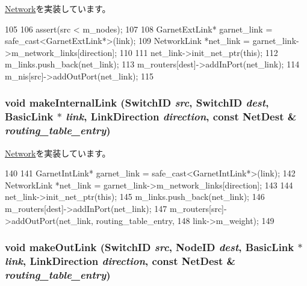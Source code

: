 \hyperlink{classNetwork_a989337badc16737935316d1faa84a017}{Network}を実装しています。


\begin{DoxyCode}
105 {
106     assert(src < m_nodes);
107 
108     GarnetExtLink* garnet_link = safe_cast<GarnetExtLink*>(link);
109     NetworkLink *net_link = garnet_link->m_network_links[direction];
110 
111     net_link->init_net_ptr(this);
112     m_links.push_back(net_link);
113     m_routers[dest]->addInPort(net_link);
114     m_nis[src]->addOutPort(net_link);
115 }
\end{DoxyCode}
\hypertarget{classGarnetNetwork_a035f37231d3a7edcadd92b7d9e17d4e4}{
\subsubsection[{makeInternalLink}]{\setlength{\rightskip}{0pt plus 5cm}void makeInternalLink ({\bf SwitchID} {\em src}, \/  {\bf SwitchID} {\em dest}, \/  {\bf BasicLink} $\ast$ {\em link}, \/  LinkDirection {\em direction}, \/  const {\bf NetDest} \& {\em routing\_\-table\_\-entry})}}
\label{classGarnetNetwork_a035f37231d3a7edcadd92b7d9e17d4e4}


\hyperlink{classNetwork_adc0a708d423af0acbe045a50a46d7b03}{Network}を実装しています。


\begin{DoxyCode}
140 {
141     GarnetIntLink* garnet_link = safe_cast<GarnetIntLink*>(link);
142     NetworkLink *net_link = garnet_link->m_network_links[direction];
143 
144     net_link->init_net_ptr(this);
145     m_links.push_back(net_link);
146     m_routers[dest]->addInPort(net_link);
147     m_routers[src]->addOutPort(net_link, routing_table_entry,
148                                          link->m_weight);
149 }
\end{DoxyCode}
\hypertarget{classGarnetNetwork_a87915d87a2b4c11ae5f0f4da31bd2375}{
\subsubsection[{makeOutLink}]{\setlength{\rightskip}{0pt plus 5cm}void makeOutLink ({\bf SwitchID} {\em src}, \/  {\bf NodeID} {\em dest}, \/  {\bf BasicLink} $\ast$ {\em link}, \/  LinkDirection {\em direction}, \/  const {\bf NetDest} \& {\em routing\_\-table\_\-entry})}}
\label{classGarnetNetwork_a87915d87a2b4c11ae5f0f4da31bd2375}


